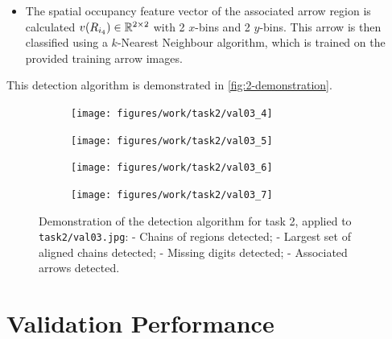 \documentclass{article}
\begin{document}
\begin{enumerate}
\begin{itemize}
  \item
    The spatial occupancy feature vector of the associated arrow region is
    calculated $v(R_{i_{4}}) \in \mathbb{R}^{2 \times 2}$ with 2 $x$-bins and 2
    $y$-bins.
    This arrow is then classified using a $k$-Nearest Neighbour algorithm,
    which is trained on the provided training arrow images.
  \end{itemize}
\end{enumerate}

This detection algorithm is demonstrated in \autoref{fig:2-demonstration}.

\begin{figure}[h]
  \centering
  \begin{subfigure}[t]{0.44\textwidth}
    \centering
    \texttt{[image: figures/work/task2/val03\_4]}
    \caption[]{}
    \label{fig:work-2-0}
  \end{subfigure}
  \begin{subfigure}[t]{0.44\textwidth}
    \centering
    \texttt{[image: figures/work/task2/val03\_5]}
    \caption[]{}
    \label{fig:work-2-1}
  \end{subfigure}

  \begin{subfigure}[t]{0.44\textwidth}
    \centering
    \texttt{[image: figures/work/task2/val03\_6]}
    \caption[]{}
    \label{fig:work-2-2}
  \end{subfigure}
  \begin{subfigure}[t]{0.44\textwidth}
    \centering
    \texttt{[image: figures/work/task2/val03\_7]}
    \caption[]{}
    \label{fig:work-2-3}
  \end{subfigure}

  \caption[Task 2 - Detection Algorithm Demonstration]{
    Demonstration of the detection algorithm for task 2, applied to
    \lstinline{task2/val03.jpg}:
    \protect{} - Chains of regions detected;
    \protect{} - Largest set of aligned chains detected;
    \protect{} - Missing digits detected;
    \protect{} - Associated arrows detected.
  }
  \label{fig:2-demonstration}
\end{figure}

\clearpage

\section{Validation Performance}
\label{sec:val}
\end{document}

